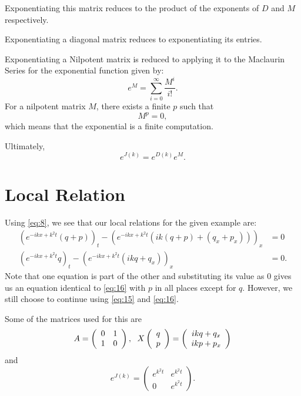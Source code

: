 \documentclass{article}
\begin{document}
Exponentiating this matrix reduces to the product of the exponents of $D$ and $M$ respectively. 

Exponentiating a diagonal matrix reduces to exponentiating its entries. 

Exponentiating a Nilpotent matrix is reduced to applying it to the Maclaurin Series for the exponential function given by:
\begin{equation}\label{eq:12}
    e^M = \sum_{i=0}^{\infty}\frac{M^i}{i!}.
\end{equation}
For a nilpotent matrix $M$, there exists a finite $p$ such that
\begin{equation}\label{eq:13}
    M^p = 0,
\end{equation}
which means that the exponential is a finite computation.

Ultimately, 
\begin{equation}\label{eq:14}
    e^{J(k)} = e^{D(k)}e^M.
\end{equation}
    
\section{Local Relation}
    Using \eqref{eq:8}, we see that our local relations for the given example are:
    \begin{align}
        (e^{-ikx+k^{2}t}(q+p))_t - (e^{-ikx+k^{2}t}(ik(q+p) + (q_x + p_x)))_x &= 0 \label{eq:15}\\
        (e^{-ikx+k^{2}t}q)_t - (e^{-ikx+k^{2}t}(ikq + q_x))_x &= 0. \label{eq:16}
    \end{align}
    Note that one equation is part of the other and substituting its value as 0 gives us an equation identical to \eqref{eq:16} with $p$ in all places except for $q$. However, we still choose to continue using \eqref{eq:15} and \eqref{eq:16}.
    
    Some of the matrices used for this are
    \begin{equation} \label{eq:17}
        A = \left(\begin{array}{cc}
        0  &  1 \\
        1  &  0
        \end{array}\right), 
        \hspace{0.5pc}X\left(\begin{array}{c}
            q  \\
             p
        \end{array}\right)
        = \left(\begin{array}{c}
            ikq + q_x  \\
            ikp + p_x
        \end{array}\right)
    \end{equation}
    and 
    \begin{equation} \label{eq:18}
        e^{J(k)} = \left(\begin{array}{cc}
         e^{k^2t} & e^{k^2t}  \\
         0    &  e^{k^2t} 
        \end{array}\right).
    \end{equation}
\end{document}
